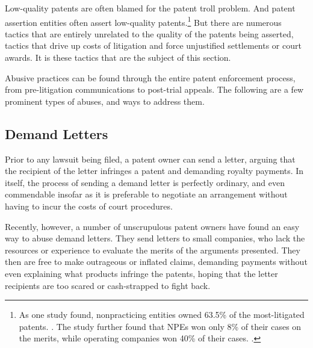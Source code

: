 \documentclass[11pt,twocolumn,titlepage]{article}
\begin{document}
Low-quality patents are often blamed for the patent troll problem.
And patent assertion entities often assert low-quality patents.\footnote{As one
study found, nonpracticing entities owned 63.5\% of the most-litigated patents.
. The study further found that NPEs won only 8\% of their
cases on the merits, while operating companies won 40\% of their cases.
.}
But there are numerous
tactics that are entirely unrelated to the quality of the patents being
asserted, tactics that drive up costs of litigation and force unjustified
settlements or court awards. It is these tactics that are the subject of this
section.

Abusive practices can be found through the entire patent enforcement process,
from pre-litigation communications to post-trial appeals. The following are a
few prominent types of abuses, and ways to address them.

\subsection{Demand Letters}
\SectionNote

Prior to any lawsuit being filed, a patent owner can send a letter, arguing that
the recipient of the letter infringes a patent and demanding royalty
payments.
In itself, the process of sending a demand letter is perfectly ordinary, and
even commendable insofar as it is preferable to negotiate an arrangement without
having to incur the costs of court procedures.

Recently, however, a number of unscrupulous patent owners have found an easy way
to abuse demand letters. They send letters to small companies, who lack the
resources or experience to evaluate the merits of the arguments presented. They
then are free to make outrageous or inflated claims, demanding payments without
even explaining what products infringe the patents, hoping that the letter
recipients are too scared or cash-strapped to fight back.
\end{document}

